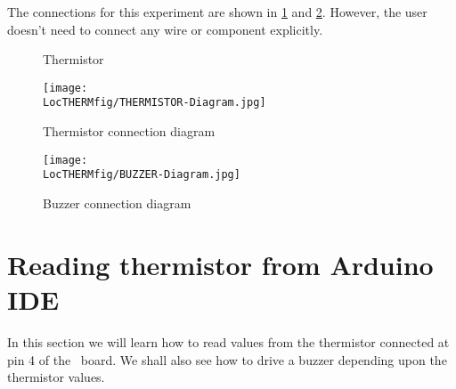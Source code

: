 The connections for this experiment are shown in \ref{fig:therm-conn} and \ref{fig:buzzer-conn}. However, the user doesn't need to connect any wire or component explicitly.


\begin{figure}
\centering
{} \hfill
{}
\caption{Thermistor}
\end{figure}


\begin{figure}
\centering
\texttt{[image: \\LocTHERMfig/THERMISTOR-Diagram.jpg]}
\caption{Thermistor connection diagram}
\label{fig:therm-conn}
\end{figure}


\begin{figure}
\centering
\texttt{[image: \\LocTHERMfig/BUZZER-Diagram.jpg]}
\caption{Buzzer connection diagram}
\label{fig:buzzer-conn}
\end{figure}

\section{Reading thermistor from Arduino IDE}
In this section we will learn how to read values from the thermistor connected at pin 4 of the \arduino\ board. We shall also see how to drive a buzzer depending upon the thermistor values.

